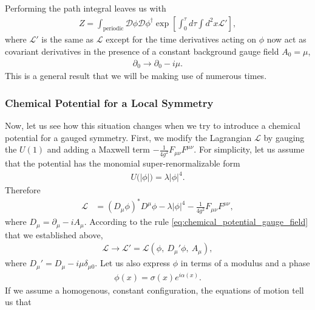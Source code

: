         Performing the path integral leaves us with
        \begin{align}
            Z= \int_{\text{periodic}} \mathcal{D}\phi \mathcal{D}\phi^{\dag} \exp \left[\int_0^{\tau} d\tau \int d^2x \mathcal{L'} \right],
        \end{align}
        where $\mathcal{L'}$ is the same as $\mathcal{L}$ except for the time derivatives acting on $\phi$ now act as covariant derivatives in the presence of a constant background gauge field $A_0=\mu$, \ie
        \begin{align}
            \partial_0 \rightarrow \partial_0 -i \mu. \label{eq:chemical_potential_gauge_field}
        \end{align}
        This is a general result that we will be making use of numerous times.
        \subsubsection{Chemical Potential for a Local Symmetry}
        Now, let us see how this situation changes when we try to introduce a chemical potential for a gauged symmetry. First, we modify the Lagrangian $\mathcal{L}$ by gauging the $U(1)$ and adding a Maxwell term $-\frac{1}{4 g^2} F_{\mu \nu} F^{\mu \nu}$. For simplicity, let us assume that the potential has the monomial super-renormalizable form
        \begin{align}
            U\big(|\phi| \big) = \lambda |\phi|^4.
        \end{align}
        Therefore
        \begin{align}
            \mathcal{L} &=( D_{\mu} \phi)^* D^{\mu} \phi - \lambda |\phi|^4 - \frac{1}{4 g^2}F_{\mu \nu} F^{\mu \nu},
        \end{align}
        where $D_{\mu}= \partial_{\mu} - i A_{\mu}$. According to the rule \ref{eq:chemical_potential_gauge_field} that we established above,\colorbox{red}{ }
        \begin{align}
            \mathcal{L} \rightarrow \mathcal{L}'= \mathcal{L}\left(\phi,\ D_{\mu}' \phi,\ A_{\mu} \right),
        \end{align}
        where $D_{\mu}' = D_{\mu} - i \mu \delta_{\mu 0}$.
        Let us also express $\phi$ in terms of a modulus and a phase
        \begin{align}
            \phi(x) = \sigma(x) e^{i \alpha(x)}.
        \end{align}
        If we assume a homogenous, constant configuration, the equations of motion tell us that
